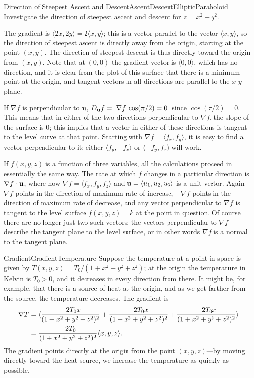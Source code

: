 \begin{example}{Direction of Steepest Ascent and Descent}{AscentDescentEllipticParaboloid}
Investigate the direction of steepest ascent and descent for
$z=x^2+y^2$.
\end{example}
\begin{solution}
The gradient is $\langle 2x,2y\rangle=2\langle x,y\rangle$; this is a
vector parallel to the vector $\langle x,y\rangle$, so the direction
of steepest ascent is directly away from the origin, starting at the
point $(x,y)$. The direction of steepest descent is thus directly
toward the origin from $(x,y)$. Note that at $(0,0)$ the gradient
vector is $\langle 0,0\rangle$, which has no direction, and it is
clear from the plot of this surface that there is a minimum point at
the origin, and tangent vectors in all directions are parallel to the
$x$-$y$ plane.
\end{solution}

If $\nabla f$ is perpendicular to $\bf u$, 
$D_{\bf u}f=|\nabla f|\cos(\pi/2)=0$, since $\cos(\pi/2)=0$.
This means that in either of the two directions perpendicular to
$\nabla f$, the slope of the surface is 0; this implies that a vector in
either of these directions is tangent to the level curve at that
point. Starting with $\nabla f=\langle f_x,f_y\rangle$, it is easy to
find a vector perpendicular to it: either $\langle f_y,-f_x\rangle$ or 
$\langle -f_y,f_x\rangle$ will work.

If $f(x,y,z)$ is a function of three variables, all the calculations
proceed in essentially the same way. The rate at which $f$ changes in
a particular direction is $\nabla f\cdot{\bf u}$, where now
$\nabla f=\langle f_x,f_y,f_z\rangle$ and ${\bf u}=\langle
u_1,u_2,u_3\rangle$ is a unit vector. Again $\nabla f$ points in the
direction of maximum rate of increase, $-\nabla f$ points in the
direction of maximum rate of decrease, and any vector perpendicular to
$\nabla f$ is tangent to the level surface $f(x,y,z)=k$ at the point
in question. Of course there are no longer just two such vectors; the
vectors perpendicular to $\nabla f$ describe the tangent plane to the
level surface, or in other words $\nabla f$ is a normal to the tangent
plane. 

\begin{example}{Gradient}{GradientTemperature}
Suppose the temperature at a point in space is given by
$T(x,y,z)=T_0/(1+x^2+y^2+z^2)$; at the origin the temperature in
Kelvin is
$T_0>0$, and it decreases in every direction from there. It might be,
for example, that there is a source of heat at the origin, and as we
get farther from the source, the temperature decreases.
The gradient is
\begin{align*}
\nabla T&=\langle {-2T_0x\over (1+x^2+y^2+z^2)^2}+
{-2T_0x\over (1+x^2+y^2+z^2)^2}+{-2T_0x\over (1+x^2+y^2+z^2)^2}\rangle	\\
&={-2T_0\over (1+x^2+y^2+z^2)^2}\langle x,y,z\rangle.	\\
\end{align*}
The gradient points directly at the origin from the point
$(x,y,z)$---by moving directly toward the heat source, we increase the
temperature as quickly as possible.
\end{example}

